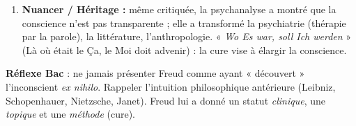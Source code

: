 \documentclass[11pt]{article}
\begin{document}
\begin{methode}
\begin{enumerate}
\begin{itemize}
      \item \textbf{Critiques féministes/sociales :} universalisation du modèle occidental bourgeois, phallocentrisme, oubli des déterminismes sociaux (Bourdieu, Fanon).
      \end{itemize}
\item \textbf{Nuancer / Héritage :} même critiquée, la psychanalyse a montré que la conscience n'est pas transparente ; elle a transformé la psychiatrie (thérapie par la parole), la littérature, l'anthropologie. « \emph{Wo Es war, soll Ich werden} » (Là où était le Ça, le Moi doit advenir) : la cure vise à élargir la conscience.
\end{enumerate}
\textbf{Réflexe Bac} : ne jamais présenter Freud comme ayant « découvert » l'inconscient \emph{ex nihilo}. Rappeler l'intuition philosophique antérieure (Leibniz, Schopenhauer, Nietzsche, Janet). Freud lui a donné un statut \emph{clinique}, une \emph{topique} et une \emph{méthode} (cure).
\end{methode}
\end{document}
